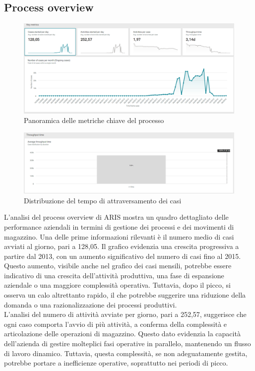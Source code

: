 \documentclass{article}
\begin{document}
\subsection{Process overview}
\begin{figure}[H]
    \centering
    \includegraphics[width=\textwidth]{imgARIS/DatiReali/ProcessOverview1DatiReali.png}
    \caption{Panoramica delle metriche chiave del processo}
    \label{fig:process-overview-1}
\end{figure}
\begin{figure}[H]
    \centering
    \includegraphics[width=\textwidth]{imgARIS/DatiReali/ProcessOverview2DatiReali.png}
    \caption{Distribuzione del tempo di attraversamento dei casi}
    \label{fig:process-overview-2}
\end{figure}
L'analisi del process overview di ARIS mostra un quadro dettagliato delle performance aziendali in termini di gestione dei processi e dei movimenti di magazzino. Una delle prime informazioni rilevanti è il numero medio di casi avviati al giorno, pari a 128,05. Il grafico evidenzia una crescita progressiva a partire dal 2013, con un aumento significativo del numero di casi fino al 2015. Questo aumento, visibile anche nel grafico dei casi mensili, potrebbe essere indicativo di una crescita dell'attività produttiva, una fase di espansione aziendale o una maggiore complessità operativa. Tuttavia, dopo il picco, si osserva un calo altrettanto rapido, il che potrebbe suggerire una riduzione della domanda o una razionalizzazione dei processi produttivi.\\
L'analisi del numero di attività avviate per giorno, pari a 252,57, suggerisce che ogni caso comporta l'avvio di più attività, a conferma della complessità e articolazione delle operazioni di magazzino. Questo dato evidenzia la capacità dell'azienda di gestire molteplici fasi operative in parallelo, mantenendo un flusso di lavoro dinamico. Tuttavia, questa complessità, se non adeguatamente gestita, potrebbe portare a inefficienze operative, soprattutto nei periodi di picco.\\
\end{document}
